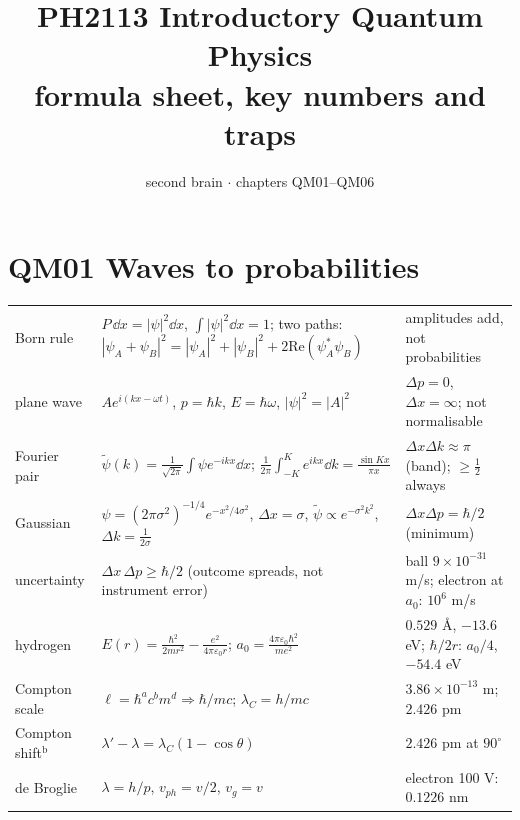 \documentclass[9pt]{article}
\title{PH2113 Introductory Quantum Physics\\\large formula sheet, key numbers and traps}
\author{second brain $\cdot$ chapters QM01--QM06}
\date{}
\begin{document}
\maketitle
\vspace{-2.2em}

\section*{QM01 Waves to probabilities}
\begin{tabular}{@{}p{2.8cm}p{8.3cm}p{6.3cm}@{}}
\toprule
Born rule & $P\,\dd x=|\psi|^2\dd x$, $\int|\psi|^2\dd x=1$; two paths: $|\psi_A+\psi_B|^2=|\psi_A|^2+|\psi_B|^2+2\mathrm{Re}(\psi_A^*\psi_B)$ & amplitudes add, not probabilities\\
plane wave & $Ae^{i(kx-\omega t)}$, $p=\hbar k$, $E=\hbar\omega$, $|\psi|^2=|A|^2$ & $\Delta p=0$, $\Delta x=\infty$; not normalisable\\
Fourier pair & $\tilde\psi(k)=\tfrac1{\sqrt{2\pi}}\!\int\!\psi e^{-ikx}\dd x$; $\tfrac1{2\pi}\!\int_{-K}^{K}\!e^{ikx}\dd k=\tfrac{\sin Kx}{\pi x}$ & $\Delta x\Delta k\approx\pi$ (band); $\ge\tfrac12$ always\\
Gaussian & $\psi=(2\pi\sigma^2)^{-1/4}e^{-x^2/4\sigma^2}$, $\Delta x=\sigma$, $\tilde\psi\propto e^{-\sigma^2k^2}$, $\Delta k=\tfrac1{2\sigma}$ & $\Delta x\Delta p=\hbar/2$ (minimum)\\
uncertainty & $\Delta x\,\Delta p\ge\hbar/2$ (outcome spreads, not instrument error) & ball $9\times10^{-31}$ m/s; electron at $a_0$: $10^6$ m/s\\
hydrogen & $E(r)=\tfrac{\hbar^2}{2mr^2}-\tfrac{e^2}{4\pi\varepsilon_0r}$; $a_0=\tfrac{4\pi\varepsilon_0\hbar^2}{me^2}$ & $0.529$ \AA, $-13.6$ eV; $\hbar/2r$: $a_0/4$, $-54.4$ eV\\
Compton scale & $\ell=\hbar^ac^bm^d\Rightarrow\hbar/mc$; $\lambda_C=h/mc$ & $3.86\times10^{-13}$ m; $2.426$ pm\\
Compton shift$^{\text{b}}$ & $\lambda'-\lambda=\lambda_C(1-\cos\theta)$ & $2.426$ pm at $90^\circ$\\
de Broglie & $\lambda=h/p$, $v_{ph}=v/2$, $v_g=v$ & electron 100 V: $0.1226$ nm\\
\bottomrule
\end{tabular}
\end{document}
